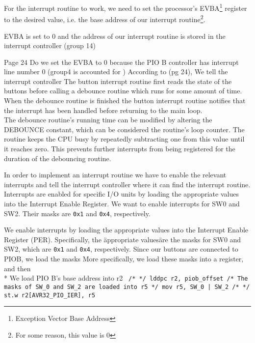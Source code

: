For the interrupt routine to work, we need to set the processor's EVBA\footnote{Exception Vector Base Address} register to the desired value, i.e. the base address of our interrupt routine\footnote{For some reason, this value is 0}.



EVBA is set to 0
and the address of our interrupt routine is stored in the interrupt controller (group 14)

Page 24
Do we set the EVBA to 0 because the PIO B controller has interrupt line number 0 (group4 is accounted for )
According to \cite{lab-compendium} (pg 24), 
We tell the interrupt controller 
The button interrupt routine first reads the state of the buttons before calling a debounce routine which runs for some amount of time.
When the debounce routine is finished the button interrupt routine notifies that the interrupt has been handled before returning to the main loop.
\\ %
The debounce routine's running time can be modified by altering the DEBOUNCE constant, which can be considered the routine's loop counter. The routine keeps the CPU busy by repeatedly subtracting one from this value until it reaches zero. This prevents further interrupts from being registered for the duration of the debouncing routine.

In order to implement an interrupt routine we have to enable the relevant interrupts and tell the interrupt controller where it can find the interrupt routine.
Interrupts are enabled for specific I/O units by loading the appropriate values into the Interrupt Enable Register.
We want to enable interrupts for SW0 and SW2.
Their masks are \texttt{0x1} and \texttt{0x4}, respectively.


We enable interrupts by loading the appropriate values into the Interrupt Enable Register (PER).
Specifically, the \"appropriate values\" are the masks for SW0 and SW2, which are \texttt{0x1} and \texttt{0x4}, respectively.
Since our buttons are connected to PIOB, we load the masks
More specifically, we load these masks into a register, and then 
\\*
We load PIO B's base address into r2
\texttt{
		/* */
		lddpc r2, piob_offset
		/* The masks of SW_0 and SW_2 are loaded into r5 */
		mov r5, SW_0 | SW_2
		/* */
		st.w r2[AVR32_PIO_IER], r5
}

